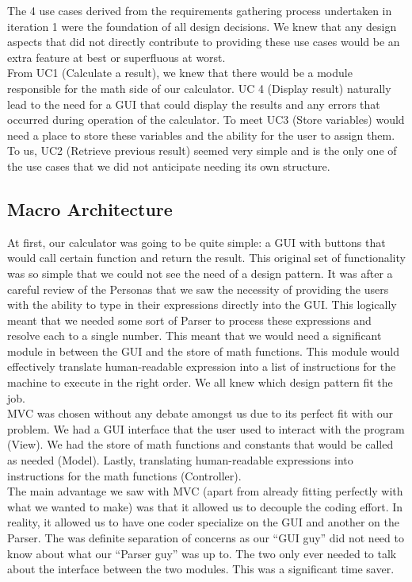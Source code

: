 \documentclass[a4paper, 12pt]{article}
\begin{document}
The 4 use cases derived from the requirements gathering process undertaken in iteration 1 were the foundation of all design decisions. We knew that any design aspects that did not directly contribute to providing these use cases would be an extra feature at best or superfluous at worst.
\\

From UC1 (Calculate a result), we knew that there would be a module responsible for the math side of our calculator. UC 4 (Display result) naturally lead to the need for a GUI that could display the results and any errors that occurred during operation of the calculator. To meet UC3 (Store variables) would need a place to store these variables and the ability for the user to assign them. To us, UC2 (Retrieve previous result) seemed very simple and is the only one of the use cases that we did not anticipate needing its own structure.


\subsection{Macro Architecture}

At first, our calculator was going to be quite simple: a GUI with buttons that would call certain function and return the result. This original set of functionality was so simple that we could not see the need of a design pattern. It was after a careful review of the Personas that we saw the necessity of providing the users with the ability to type in their expressions directly into the GUI. This logically meant that we needed some sort of Parser to process these expressions and resolve each to a single number. This meant that we would need a significant module in between the GUI and the store of math functions. This module would effectively translate human-readable expression into a list of instructions for the machine to execute in the right order. We all knew which design pattern fit the job.
\\

MVC was chosen without any debate amongst us due to its perfect fit with our problem. We had a GUI interface that the user used to interact with the program (View). We had the store of math functions and constants that would be called as needed (Model). Lastly, translating human-readable expressions into instructions for the math functions (Controller).
\\

The main advantage we saw with MVC (apart from already fitting perfectly with what we wanted to make) was that it allowed us to decouple the coding effort. In reality, it allowed us to have one coder specialize on the GUI and another on the Parser. The was definite separation of concerns as our “GUI guy” did not need to know about what our “Parser guy” was up to. The two only ever needed to talk about the interface between the two modules. This was a significant time saver.
\\
\end{document}
